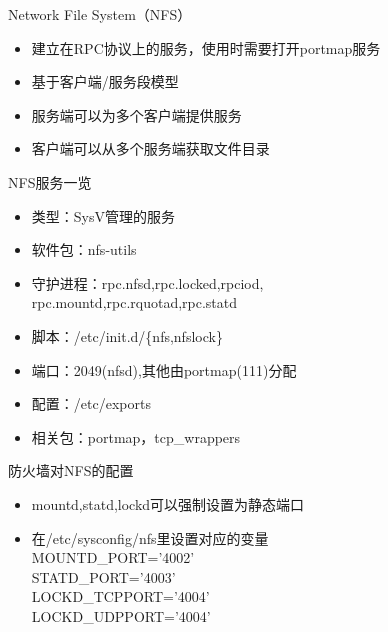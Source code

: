 \begin{frame}{Network File System（NFS）}
\begin{itemize}
\item 建立在RPC协议上的服务，使用时需要打开portmap服务
\item 基于客户端/服务段模型
\item 服务端可以为多个客户端提供服务
\item 客户端可以从多个服务端获取文件目录
\end{itemize}

\end{frame} 
\begin{frame}{NFS服务一览}
\begin{itemize}
\item 类型：SysV管理的服务
\item 软件包：nfs-utils
\item 守护进程：rpc.nfsd,rpc.locked,rpciod,\\
rpc.mountd,rpc.rquotad,rpc.statd
\item 脚本：/etc/init.d/\{nfs,nfslock\}
\item 端口：2049(nfsd),其他由portmap(111)分配
\item 配置：/etc/exports
\item 相关包：portmap，tcp\_wrappers
\end{itemize}

\end{frame} 
\begin{frame}{防火墙对NFS的配置}
\begin{itemize}
\item mountd,statd,lockd可以强制设置为静态端口
\item 在/etc/sysconfig/nfs里设置对应的变量\\
MOUNTD\_PORT='4002'\\
STATD\_PORT='4003'\\
LOCKD\_TCPPORT='4004'\\
LOCKD\_UDPPORT='4004'
\end{itemize}

\end{frame} 
